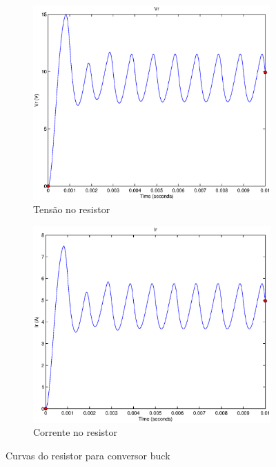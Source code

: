 \documentclass{article}
\begin{document}
\begin{figure}[H]
	\centering
	\begin{subfigure}[b]{0.4\linewidth}
		\includegraphics[width=\linewidth]{matlab/buck/b_vr}
		\caption{Tensão no resistor}
	\end{subfigure}
	\begin{subfigure}[b]{0.4\linewidth}
		\centering
		\includegraphics[width=\linewidth]{matlab/buck/b_ir}
		\caption{Corrente no resistor}
	\end{subfigure}
	\caption{Curvas do resistor para conversor buck}
	\label{fig:br}
\end{figure}
\end{document}
